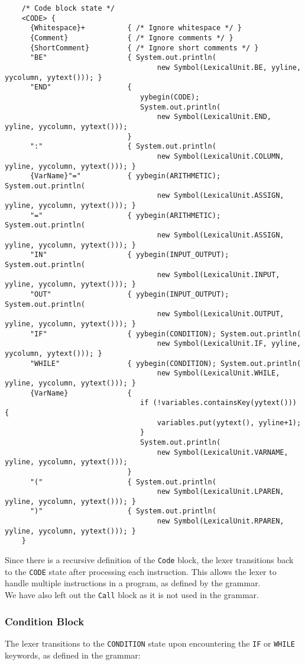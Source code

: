 \documentclass{article}
\begin{document}
	\begin{verbatim}
	/* Code block state */
	<CODE> {
	  {Whitespace}+          { /* Ignore whitespace */ }
	  {Comment}              { /* Ignore comments */ }
	  {ShortComment}         { /* Ignore short comments */ }
	  "BE"                   { System.out.println(
									new Symbol(LexicalUnit.BE, yyline, yycolumn, yytext())); }
	  "END"                  {
								yybegin(CODE);
								System.out.println(
									new Symbol(LexicalUnit.END, yyline, yycolumn, yytext()));
						     }
	  ":"                    { System.out.println(
									new Symbol(LexicalUnit.COLUMN, yyline, yycolumn, yytext())); }
	  {VarName}"="           { yybegin(ARITHMETIC); System.out.println(
									new Symbol(LexicalUnit.ASSIGN, yyline, yycolumn, yytext())); }
	  "="                    { yybegin(ARITHMETIC); System.out.println(
									new Symbol(LexicalUnit.ASSIGN, yyline, yycolumn, yytext())); }
	  "IN"                   { yybegin(INPUT_OUTPUT); System.out.println(
									new Symbol(LexicalUnit.INPUT, yyline, yycolumn, yytext())); }
	  "OUT"                  { yybegin(INPUT_OUTPUT); System.out.println(
									new Symbol(LexicalUnit.OUTPUT, yyline, yycolumn, yytext())); }
	  "IF"                   { yybegin(CONDITION); System.out.println(
									new Symbol(LexicalUnit.IF, yyline, yycolumn, yytext())); }
	  "WHILE"                { yybegin(CONDITION); System.out.println(
									new Symbol(LexicalUnit.WHILE, yyline, yycolumn, yytext())); }
	  {VarName}              {
								if (!variables.containsKey(yytext())) {
									variables.put(yytext(), yyline+1);
								}
								System.out.println(
									new Symbol(LexicalUnit.VARNAME, yyline, yycolumn, yytext()));
							 }
	  "("                    { System.out.println(
									new Symbol(LexicalUnit.LPAREN, yyline, yycolumn, yytext())); }
	  ")"                    { System.out.println(
									new Symbol(LexicalUnit.RPAREN, yyline, yycolumn, yytext())); }
	}
	\end{verbatim}

	Since there is a recursive definition of the \texttt{Code} block, the lexer transitions back to the \texttt{CODE} state after processing each instruction. This allows the lexer to handle multiple instructions in a program, as defined by the grammar.\\

	We have also left out the \texttt{Call} block as it is not used in the grammar.\\


	\subsubsection{Condition Block}
	The lexer transitions to the \texttt{CONDITION} state upon encountering the \texttt{IF} or \texttt{WHILE} keywords, as defined in the grammar:
\end{document}
